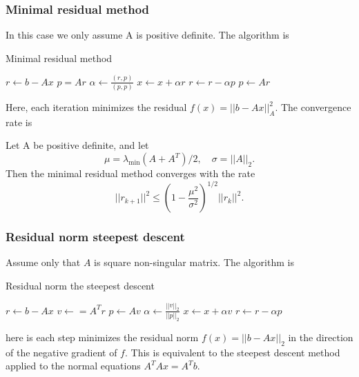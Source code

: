 \subsubsection{Minimal residual method} 
In this case we only assume A is positive definite. The algorithm is
\begin{algorithm}[H]
    \caption{Minimal residual method \cite[Algorithm 5.3]{iter_method_saad}}
    \begin{algorithmic}
        \State $r \leftarrow b - Ax$
        \State $p = Ar$
        \State $\alpha \leftarrow \frac{(r, p)}{(p, p)}$
        \State $x \leftarrow x + \alpha r$
        \State $r \leftarrow r - \alpha p$
        \State $p \leftarrow Ar$
        \EndWhile
    \end{algorithmic}
\end{algorithm}
Here, each iteration minimizes the residual $f(x) = ||b - Ax||_A^2$.
The convergence rate is \cite[Theorem 5.10]{iter_method_saad}
\begin{theorem}
    Let A be positive definite, and let
    \[
        \mu = \lambda_{\text{min}}(A + A^T) / 2, \quad \sigma = ||A||_2.
    \]
    Then the minimal residual method converges with the rate
    \begin{equation}
        ||r_{k+1}||^2 \leq \left( 1 - \frac{\mu^2}{\sigma^2} \right)^{1/2} ||r_k||^2.
        \label{eq:minimal_residual_convergence}
    \end{equation}
\end{theorem}

\subsubsection{Residual norm steepest descent} 
Assume only that $A$ is square non-singular matrix. The algorithm is
\begin{algorithm}[H]
    \caption{Residual norm the steepest descent \cite[Alogrithm 5.4]{iter_method_saad}}
    \begin{algorithmic}
        \State $r \leftarrow b - Ax$
        \State $v \leftarrow = A^T r$
        \State $p \leftarrow Av$
        \State $\alpha \leftarrow \frac{||v||_2}{||p||_2}$
        \State $x \leftarrow x + \alpha v$
        \State $r \leftarrow r - \alpha p$
        \EndWhile
    \end{algorithmic}
\end{algorithm}
here is each step minimizes the residual norm $f(x) = ||b - Ax||_2$ in the direction of the negative gradient of $f$. This is equivalent to the steepest descent method applied to the normal equations $A^TAx = A^Tb$.